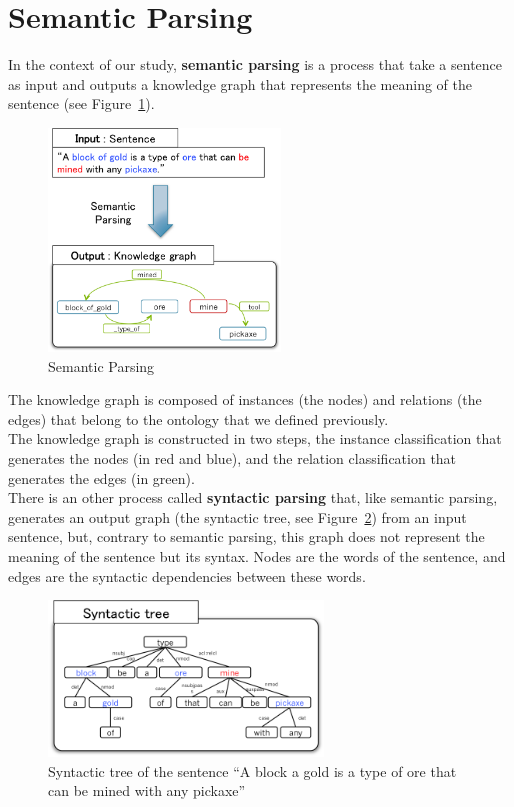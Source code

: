 \documentclass[12pt]{article}
\begin{document}
\newpage
\section{Semantic Parsing}

In the context of our study, \textbf{semantic parsing} is a process that take a sentence as input and outputs a knowledge graph that represents the meaning of the sentence (see Figure~\ref{semanticParsingFigure}).

\begin{figure}[!ht]
	\centering \includegraphics[width=0.55\textwidth]{Figures/Semantic_Parsing/semanticParsingFigure.png}
	\caption{\label{semanticParsingFigure}Semantic Parsing}
\end{figure}

The knowledge graph is composed of instances (the nodes) and relations (the edges) that belong to the ontology that we defined previously.\\
The knowledge graph is constructed in two steps, the instance classification that generates the nodes (in red and blue), and the relation classification that generates the edges (in green).\\
There is an other process called \textbf{syntactic parsing} that, like semantic parsing, generates an output graph (the syntactic tree, see Figure~\ref{syntacticTree}) from an input sentence, but, contrary to semantic parsing, this graph does not represent the meaning of the sentence but its syntax. Nodes are the words of the sentence, and edges are the syntactic dependencies between these words.

\begin{figure}[!ht]
	\centering \includegraphics[width=0.65\textwidth]{Figures/Semantic_Parsing/syntacticTree.png}
	\caption{\label{syntacticTree}Syntactic tree of the sentence ``A block a gold is a type of ore that can be mined with any pickaxe''}
\end{figure}
\end{document}
